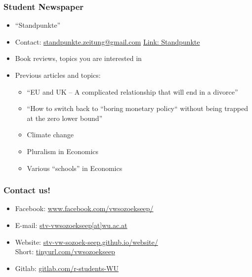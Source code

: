 \documentclass{beamer}
\begin{document}
\begin{frame}
  \frametitle{Student Newspaper}
  \begin{itemize}
  \item ``Standpunkte''
  \item Contact: \href{mailto:standpunkte.zeitung@gmail.com}{standpunkte.zeitung@gmail.com}
    \href{https://www.wu.ac.at/economics/vw-zentrum/standpunkte/}{Link: Standpunkte}
  \item Book reviews, topics you are interested in
  \item Previous articles and topics:
    \begin{itemize}
    \item ``EU and UK – A complicated relationship that will end in a divorce''
    \item ``How to switch back to “boring monetary policy“ without being trapped at the zero lower bound''
    \item Climate change
    \item Pluralism in Economics
    \item Various ``schools'' in Economics
    \end{itemize}
  \end{itemize}
\end{frame}
\begin{frame}
  \frametitle{Contact us!}
  \begin{itemize}
  \item Facebook: \href{https://www.facebook.com/vwsozoekseep/}{www.facebook.com/vwsozoekseep/}
  \item E-mail: \href{mailto:stv-vwsozoekseep@wu.ac.at}{stv-vwsozoekseep[at]wu.ac.at}
  \item Website: \href{https://stv-vw-sozoek-seep.github.io/website/}{stv-vw-sozoek-seep.github.io/website/} \\
    Short: \href{https://tinyurl.com/vwsozoekseep}{tinyurl.com/vwsozoekseep}
  \item Gitlab: \href{https://gitlab.com/r-students-WU}{gitlab.com/r-students-WU}
  \end{itemize}
\end{frame}
\end{document}
